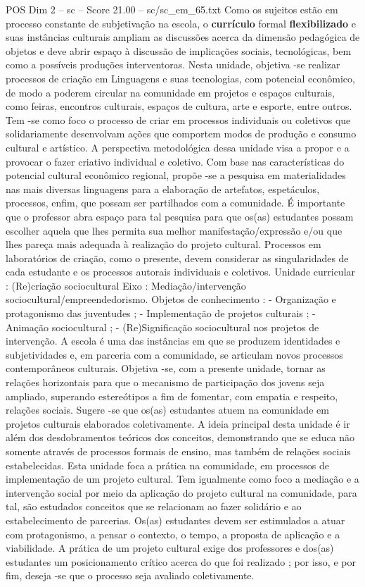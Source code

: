 \begin{textsample}{POS Dim 2 – sc – Score 21.00 – sc/sc\_em\_65.txt}
Como os sujeitos estão em processo constante de subjetivação na escola, o \textbf{currículo} formal \textbf{flexibilizado} e suas instâncias culturais ampliam as discussões acerca da dimensão pedagógica de objetos e deve abrir espaço à discussão de implicações sociais, tecnológicas, bem como a possíveis produções interventoras.
Nesta unidade, objetiva -se realizar processos de criação em Linguagens e suas tecnologias, com potencial econômico, de modo a poderem circular na comunidade em projetos e espaços culturais, como feiras, encontros culturais, espaços de cultura, arte e esporte, entre outros.
Tem -se como foco o processo de criar em processos individuais ou coletivos que solidariamente desenvolvam ações que comportem modos de produção e consumo cultural e artístico.
A perspectiva metodológica dessa unidade visa a propor e a provocar o fazer criativo individual e coletivo.
Com base nas características do potencial cultural econômico regional, propõe -se a pesquisa em materialidades nas mais diversas linguagens para a elaboração de artefatos, espetáculos, processos, enfim, que possam ser partilhados com a comunidade.
É importante que o professor abra espaço para tal pesquisa para que os(as) estudantes possam escolher aquela que lhes permita sua melhor manifestação/expressão e/ou que lhes pareça mais adequada à realização do projeto cultural.
Processos em laboratórios de criação, como o presente, devem considerar as singularidades de cada estudante e os processos autorais individuais e coletivos.
Unidade curricular : (Re)criação sociocultural Eixo : Mediação/intervenção sociocultural/empreendedorismo.
Objetos de conhecimento : - Organização e protagonismo das juventudes ; - Implementação de projetos culturais ; - Animação sociocultural ; - (Re)Significação sociocultural nos projetos de intervenção.
A escola é uma das instâncias em que se produzem identidades e subjetividades e, em parceria com a comunidade, se articulam novos processos contemporâneos culturais.
Objetiva -se, com a presente unidade, tornar as relações horizontais para que o mecanismo de participação dos jovens seja ampliado, superando estereótipos a fim de fomentar, com empatia e respeito, relações sociais.
Sugere -se que os(as) estudantes atuem na comunidade em projetos culturais elaborados coletivamente.
A ideia principal desta unidade é ir além dos desdobramentos teóricos dos conceitos, demonstrando que se educa não somente através de processos formais de ensino, mas também de relações sociais estabelecidas.
Esta unidade foca a prática na comunidade, em processos de implementação de um projeto cultural.
Tem igualmente como foco a mediação e a intervenção social por meio da aplicação do projeto cultural na comunidade, para tal, são estudados conceitos que se relacionam ao fazer solidário e ao estabelecimento de parcerias.
Os(as) estudantes devem ser estimulados a atuar com protagonismo, a pensar o contexto, o tempo, a proposta de aplicação e a viabilidade.
A prática de um projeto cultural exige dos professores e dos(as) estudantes um posicionamento crítico acerca do que foi realizado ; por isso, e por fim, deseja -se que o processo seja avaliado coletivamente.


\end{textsample}

